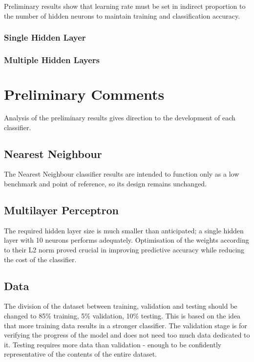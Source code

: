 Preliminary results show that learning rate must be set in indirect proportion to the number of hidden neurons to maintain training and classification accuracy.

\subsubsection{Single Hidden Layer}

\subsubsection{Multiple Hidden Layers}

\section{Preliminary Comments}
Analysis of the preliminary results gives direction to the development of each classifier. 

\subsection{Nearest Neighbour}
The Nearest Neighbour classifier results are intended to function only as a low benchmark and point of reference, so its design remains unchanged.

\subsection{Multilayer Perceptron}

The required hidden layer size is much smaller than anticipated; a single hidden layer with 10 neurons performs adequately. Optimisation of the weights according to their L2 norm proved crucial in improving predictive accuracy while reducing the cost of the classifier.

\subsection{Data}
The division of the dataset between training, validation and testing should be changed to 85\% training, 5\% validation, 10\% testing. This is based on the idea that more training data results in a stronger classifier. The validation stage is for verifying the progress of the model and does not need too much data dedicated to it. Testing requires more data than validation - enough to be confidently representative of the contents of the entire dataset.


